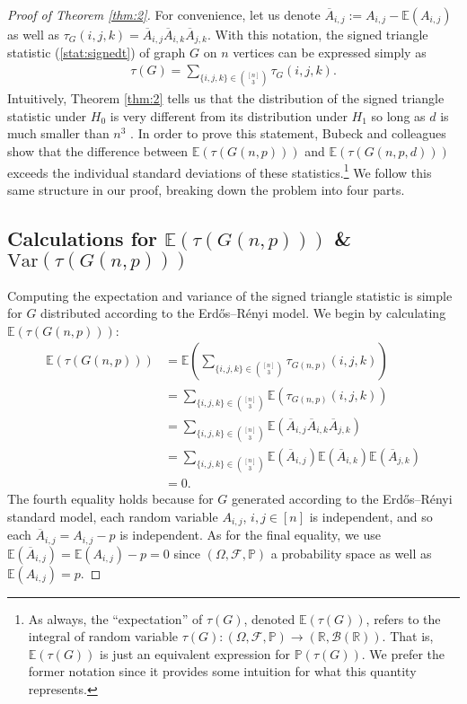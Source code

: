 \documentclass{article}
\begin{document}
\begin{proof}[Proof of Theorem \ref{thm:2}] 
For convenience, let us denote $\overline{A}_{i,j} := A_{i,j} - \mathbb{E}(A_{i,j})$ as well as $\tau_G(i,j,k) = \overline{A}_{i,j}\overline{A}_{i,k}\overline{A}_{j,k}$. With this notation, the signed triangle statistic (\ref{stat:signedt}) of graph $G$ on $n$ vertices can be expressed simply as 
\begin{align*}
    \tau(G) = \sum\limits_{ \{i,j,k\} \in \binom{[n]}{3}} \tau_G(i,j,k).
\end{align*}
Intuitively, Theorem \ref{thm:2} tells us that the distribution of the signed triangle statistic under $H_0$ is very different from its distribution under $H_1$ so long as $d$ is much smaller than $n^3$ \cite{bubeck2016testing}. In order to prove this statement, Bubeck and colleagues show that the difference between $\mathbb{E}(\tau(G(n,p)))$ and $\mathbb{E}(\tau(G(n,p,d)))$ exceeds the individual standard deviations of these statistics.\footnote{As always, the \enquote{expectation} of $\tau(G)$, denoted $\mathbb{E}(\tau(G))$, refers to the integral of random variable $\tau(G): (\Omega, \mathcal{F}, \mathbb{P}) \rightarrow (\mathbb{R}, \mathcal{B}(\mathbb{R}))$. That is,  $\mathbb{E}(\tau(G))$ is just an equivalent expression for $\mathbb{P}(\tau(G))$. We prefer the former notation since it provides some intuition for what this quantity represents.} We follow this same structure in our proof, breaking down the problem into four parts. 

\subsection{Calculations for $\mathbb{E}(\tau(G(n,p)))$ \& $\text{Var}(\tau(G(n,p)))$}\label{signednull}
Computing the expectation and variance of the signed triangle statistic is simple for $G$ distributed according to the Erdős–Rényi model. We begin by calculating $\mathbb{E}(\tau(G(n,p)))$:
\begin{align*}
    \mathbb{E}(\tau(G(n, p))) &= \mathbb{E} \left( \sum\limits_{ \{i,j,k\} \in \binom{[n]}{3}} \tau_{G(n,p)}(i,j,k) \right)\\
    &= \sum\limits_{ \{i,j,k\} \in \binom{[n]}{3}} \mathbb{E}\left( \tau_{G(n,p)}(i,j,k) \right)\\
    &= \sum\limits_{ \{i,j,k\} \in \binom{[n]}{3}} \mathbb{E}\left(\overline{A}_{i,j}\overline{A}_{i,k}\overline{A}_{j,k} \right)\\
    &= \sum\limits_{ \{i,j,k\} \in \binom{[n]}{3}}\mathbb{E}\left(\overline{A}_{i,j} \right) \mathbb{E}\left(\overline{A}_{i,k} \right) \mathbb{E} \left(\overline{A}_{j,k} \right)\\
    &= 0.
\end{align*}
The fourth equality holds because for $G$ generated according to the Erdős–Rényi standard model, each random variable $A_{i,j}$, $i, j \in [n]$ is independent, and so each $\overline{A}_{i,j} = A_{i,j} - p$ is independent. As for the final equality, we use $\mathbb{E}\left(\overline{A}_{i,j} \right) = \mathbb{E}(A_{i,j}) - p = 0$ since $(\Omega, \mathcal{F}, \mathbb{P})$ a probability space as well as $\mathbb{E}(A_{i,j}) = p$.


\end{proof}
\end{document}

